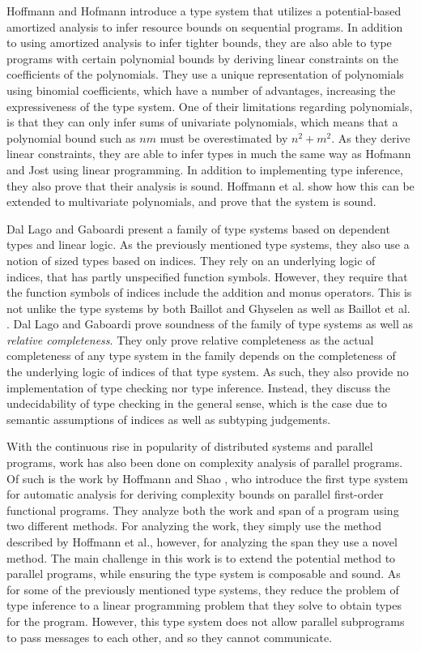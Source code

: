 Hoffmann and Hofmann \cite{HofmannAndHoffmann2010} introduce a type system that utilizes a potential-based amortized analysis to infer resource bounds on sequential programs. In addition to using amortized analysis to infer tighter bounds, they are also able to type programs with certain polynomial bounds by deriving linear constraints on the coefficients of the polynomials. They use a unique representation of polynomials using binomial coefficients, which have a number of advantages, increasing the expressiveness of the type system. One of their limitations regarding polynomials, is that they can only infer sums of univariate polynomials, which means that a polynomial bound such as $nm$ must be overestimated by $n^2 + m^2$. As they derive linear constraints, they are able to infer types in much the same way as Hofmann and Jost using linear programming. In addition to implementing type inference, they also prove that their analysis is sound. Hoffmann et al. \cite{HoffmannEtAl2012} show how this can be extended to multivariate polynomials, and prove that the system is sound.

Dal Lago and Gaboardi \cite{DalLagoGaboardi2011} present a family of type systems based on dependent types and linear logic. As the previously mentioned type systems, they also use a notion of sized types based on indices. They rely on an underlying logic of indices, that has partly unspecified function symbols. However, they require that the function symbols of indices include the addition and monus operators. This is not unlike the type systems by both Baillot and Ghyselen \cite{BaillotGhyselen2021} as well as Baillot et al. \cite{BaillotEtAl2021}. Dal Lago and Gaboardi prove soundness of the family of type systems as well as \textit{relative completeness}. They only prove relative completeness as the actual completeness of any type system in the family depends on the completeness of the underlying logic of indices of that type system. As such, they also provide no implementation of type checking nor type inference. Instead, they discuss the undecidability of type checking in the general sense, which is the case due to semantic assumptions of indices as well as subtyping judgements.

With the continuous rise in popularity of distributed systems and parallel programs, work has also been done on complexity analysis of parallel programs. Of such is the work by Hoffmann and Shao \cite{HoffmannShao2015}, who introduce the first type system for automatic analysis for deriving complexity bounds on parallel first-order functional programs. They analyze both the work and span of a program using two different methods. For analyzing the work, they simply use the method described by Hoffmann et al., however, for analyzing the span they use a novel method. The main challenge in this work is to extend the potential method to parallel programs, while ensuring the type system is composable and sound. As for some of the previously mentioned type systems, they reduce the problem of type inference to a linear programming problem that they solve to obtain types for the program. However, this type system does not allow parallel subprograms to pass messages to each other, and so they cannot communicate.

